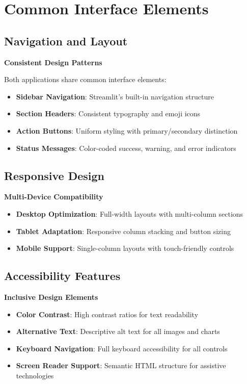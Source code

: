 \section{Common Interface Elements}

\subsection{Navigation and Layout}

\textbf{Consistent Design Patterns}

Both applications share common interface elements:

\begin{itemize}
    \item \textbf{Sidebar Navigation}: Streamlit's built-in navigation structure
    \item \textbf{Section Headers}: Consistent typography and emoji icons
    \item \textbf{Action Buttons}: Uniform styling with primary/secondary distinction
    \item \textbf{Status Messages}: Color-coded success, warning, and error indicators
\end{itemize}

\subsection{Responsive Design}

\textbf{Multi-Device Compatibility}

\begin{itemize}
    \item \textbf{Desktop Optimization}: Full-width layouts with multi-column sections
    \item \textbf{Tablet Adaptation}: Responsive column stacking and button sizing
    \item \textbf{Mobile Support}: Single-column layouts with touch-friendly controls
\end{itemize}

\subsection{Accessibility Features}

\textbf{Inclusive Design Elements}

\begin{itemize}
    \item \textbf{Color Contrast}: High contrast ratios for text readability
    \item \textbf{Alternative Text}: Descriptive alt text for all images and charts
    \item \textbf{Keyboard Navigation}: Full keyboard accessibility for all controls
    \item \textbf{Screen Reader Support}: Semantic HTML structure for assistive technologies
\end{itemize}

